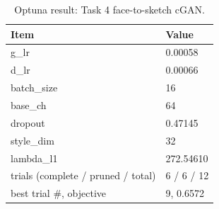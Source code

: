 \begin{table}[t]
\centering
\caption{Optuna result: Task 4 face-to-sketch cGAN.}
\label{tab:optuna_gan_best}
\footnotesize
\begin{tabular}{ll}
\toprule
Item & Value \\
\midrule
g\_lr & 0.00058 \\
d\_lr & 0.00066 \\
batch\_size & 16 \\
base\_ch & 64 \\
dropout & 0.47145 \\
style\_dim & 32 \\
lambda\_l1 & 272.54610 \\
trials (complete / pruned / total) & 6 / 6 / 12 \\
best trial \#, objective & 9, 0.6572 \\
\bottomrule
\end{tabular}
\end{table}

